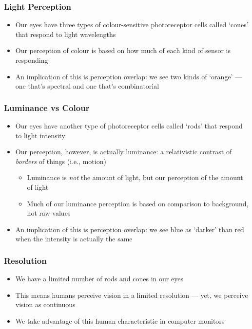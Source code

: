 \begin{frame}
	\frametitle{Light Perception}
	\begin{itemize}
		\item Our eyes have three types of colour-sensitive photoreceptor cells called `cones' that respond to light wavelengths
		\item Our perception of colour is based on how much of each kind of sensor is responding
		\item An implication of this is perception overlap: we see two kinds of `orange' --- one that's spectral and one that's combinatorial
	\end{itemize}
\end{frame}


\begin{frame}
	\frametitle{Luminance vs Colour}
	\begin{itemize}
		\item Our eyes have another type of photoreceptor cells called `rods' that respond to light intensity
		\item Our perception, however, is actually luminance: a relativistic contrast of \textit{borders} of things (i.e., motion) 
		\begin{itemize}
			\item Luminance is \textit{not} the amount of light, but our perception of the amount of light
			\item Much of our luminance perception is based on comparison to background, not raw values
		\end{itemize}
		\item An implication of this is perception overlap: we see blue as `darker' than red when the intensity is actually the same
	\end{itemize}
\end{frame}


\begin{frame}
	\frametitle{Resolution}
	\begin{itemize}
		\item We have a limited number of rods and cones in our eyes
		\item This means humans perceive vision in a limited resolution --- yet, we perceive vision as continuous
		\item We take advantage of this human characteristic in computer monitors
	\end{itemize}
\end{frame}

